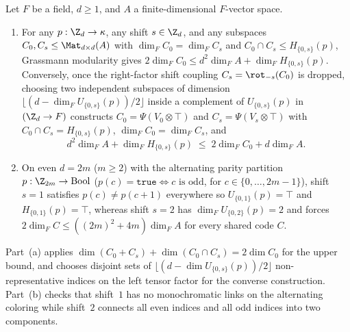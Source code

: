 \begin{proposition}\label{prop:mask-floors}
Let $F$ be a field, $d \ge 1$, and $A$ a finite-dimensional $F$-vector space.
\begin{enumerate}[label=(\alph*)]
\item For any $p : \Z_d \to \kappa$, any shift $s \in \Z_d$, and any subspaces
  $C_0, C_s \le \Mat_{d\times d}(A)$ with $\dim_F C_0 = \dim_F C_s$ and
  $C_0 \cap C_s \le H_{\{0,s\}}(p)$, Grassmann modularity gives
  $2\dim_F C_0 \le d^2\dim_F A + \dim_F H_{\{0,s\}}(p)$. Conversely, once the right-factor shift
  coupling $C_s = \rot_{-s}(C_0)$ is dropped, choosing two independent subspaces of dimension
  $\lfloor(d - \dim_F U_{\{0,s\}}(p))/2\rfloor$ inside a complement of $U_{\{0,s\}}(p)$ in
  $(\Z_d \to F)$ constructs $C_0 = \Psi(V_0 \otimes \top)$ and
  $C_s = \Psi(V_s \otimes \top)$ with $C_0 \cap C_s = H_{\{0,s\}}(p)$, $\dim_F C_0 = \dim_F C_s$, and
  \[
    d^2\dim_F A + \dim_F H_{\{0,s\}}(p) \;\le\; 2\dim_F C_0 + d\dim_F A.
  \]
\item On even $d = 2m$ ($m \ge 2$) with the alternating parity partition
  $p : \Z_{2m} \to \mathrm{Bool}$ ($p(c) = \texttt{true} \iff c \text{ is odd}$, for
  $c \in \{0,\dots,2m-1\}$), shift
  $s = 1$ satisfies $p(c) \ne p(c+1)$ everywhere so $U_{\{0,1\}}(p) = \top$ and
  $H_{\{0,1\}}(p) = \top$, whereas shift $s = 2$ has $\dim_F U_{\{0,2\}}(p) = 2$ and forces
  $2\dim_F C \le ((2m)^2 + 4m)\dim_F A$ for every shared code $C$.
\end{enumerate}
\end{proposition}
\begin{outline}
Part~(a) applies $\dim(C_0 + C_s) + \dim(C_0 \cap C_s) = 2\dim C_0$ for the upper bound, and chooses
disjoint sets of $\lfloor(d - \dim U_{\{0,s\}}(p))/2\rfloor$ non-representative indices on the left
tensor factor for the converse construction. Part~(b) checks that shift~$1$ has no monochromatic
links on the alternating coloring while shift~$2$ connects all even indices and all odd indices into
two components.
\end{outline}
